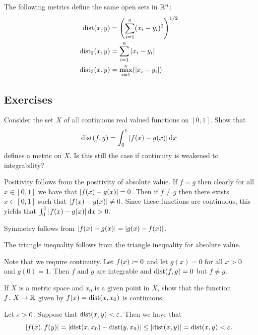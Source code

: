 \documentclass[letterpaper, 11pt]{article}
\begin{document}
\begin{cor}
  The following metrics define the same open sets in $\mathbb{R}^{n}$:
  \begin{align*}
    \dist(x, y) &= \pqty{\sum_{i = 1}^{n} (x_{i} - y_{i})^{2}}^{1/2} \\
    \dist_{2}(x, y) &= \sum_{i = 1}^{n} \abs{x_{i} - y_{i}} \\
    \dist_{3}(x, y) &= \max_{i = 1}^{n} (\abs{x_{i} - y_{i}})
  \end{align*}
\end{cor}

\clearpage

\subsection*{Exercises}

\begin{exercise}
  Consider the set $X$ of all continuous real valued functions on $[0, 1]$.
  Show that
  \[
    \operatorname{dist}(f, g) = \int_{0}^{1} \abs{f(x) - g(x)} \dd{x}
  \]
  defines a metric on $X$.
  Is this still the case if continuity is weakened to integrability?
\end{exercise}
\begin{pf}
  Positivity follows from the positivity of absolute value.
  If $f = g$ then clearly for all $x \in [0, 1]$ we have that $\abs{f(x) - g(x)} = 0$.
  Then if $f \neq g$ then there exists $x \in [0, 1]$ such that $\abs{f(x) - g(x)} \neq 0$.
  Since these functions are continuous, this yields that $\int_{0}^{1} \abs{f(x) - g(x)} \dd{x} > 0$.

  Symmetry follows from $\abs{f(x) - g(x)} = \abs{g(x) - f(x)}$.

  The triangle inequality follows from the triangle inequality for absolute value.

  Note that we require continuity.
  Let $f(x) \coloneqq 0$ and let $g(x) = 0$ for all $x > 0$ and $g(0) = 1$.
  Then $f$ and $g$ are integrable and $\operatorname{dist}(f, g) = 0$ but $f \neq g$.
\end{pf}

\begin{exercise}
  If $X$ is a metric space and $x_{0}$ is a given point in $X$, show that the function $f\colon X \to \mathbb{R}$ given by $f(x) = \operatorname{dist}(x, x_{0})$ is continuous.
\end{exercise}
\begin{pf}
  Let $\varepsilon > 0$.
  Suppose that $\operatorname{dist}(x, y) < \varepsilon$.
  Then we have that
  \[
    \abs{f(x), f(y)} = \abs{\operatorname{dist}(x, x_{0}) - \operatorname{dist}(y, x_{0})} \leq \abs{\operatorname{dist}(x, y)} = \operatorname{dist}(x, y) < \varepsilon.
  \]
\end{pf}
\end{document}
